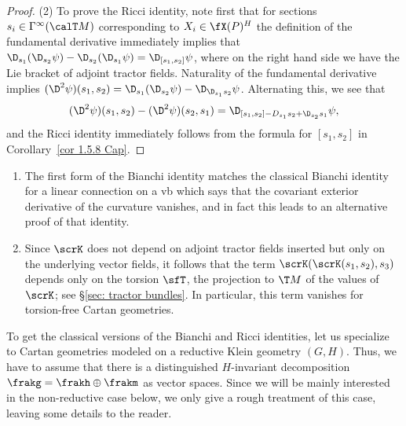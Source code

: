 \begin{proof}
    (2) To prove the Ricci identity, note first that for sections $s_i\in\Gamma^\infty(\calT M)$ corresponding to $X_i\in\fX(P)^H$ the definition of the fundamental derivative immediately implies that $\D_{s_1}(\D_{s_2}\psi)-\D_{s_2}(\D_{s_1}\psi)=\D_{[s_1,s_2]}\psi$, where on the right hand side we have the Lie bracket of adjoint tractor fields. Naturality of the fundamental derivative implies $(\D^2\psi)(s_1,s_2)=\D_{s_1}(\D_{s_2}\psi)-\D_{\D_{s_1}s_2}\psi$. Alternating this, we see that 
    \[(\D^2\psi)(s_1,s_2)-(\D^2\psi)(s_2,s_1)=\D_{[s_1,s_2]-D_{s_1}s_2+\D_{s_2}s_1}\psi,\]
    and the Ricci identity immediately follows from the formula for $[s_1,s_2]$ in Corollary~\ref{cor 1.5.8 Cap}.
\end{proof}

\begin{rem}
    \begin{enumerate}[label=(\arabic*)]
        \item The first form of the Bianchi identity matches the classical Bianchi identity for a linear connection on a \gls{vb} which says that the covariant exterior derivative of the curvature vanishes, and in fact this leads to an alternative proof of that identity.
        \item Since $\scrK$ does not depend on adjoint tractor fields inserted but only on the underlying vector fields, it follows that the term $\scrK(\scrK(s_1,s_2),s_3)$ depends only on the torsion $\sfT$, the projection to $\T M$ of the values of $\scrK$; see \S\ref{sec: tractor bundles}. In particular, this term vanishes for torsion-free Cartan geometries.
    \end{enumerate}
\end{rem}

To get the classical versions of the Bianchi and Ricci identities, let us specialize to Cartan geometries modeled on a reductive Klein geometry $(G,H)$. Thus, we have to assume that there is a distinguished $H$-invariant decomposition  $\frakg=\frakh\oplus\frakm$ as vector spaces.  Since we will be mainly interested in the non-reductive case below, we only give a rough treatment of this case, leaving some details to the reader.

